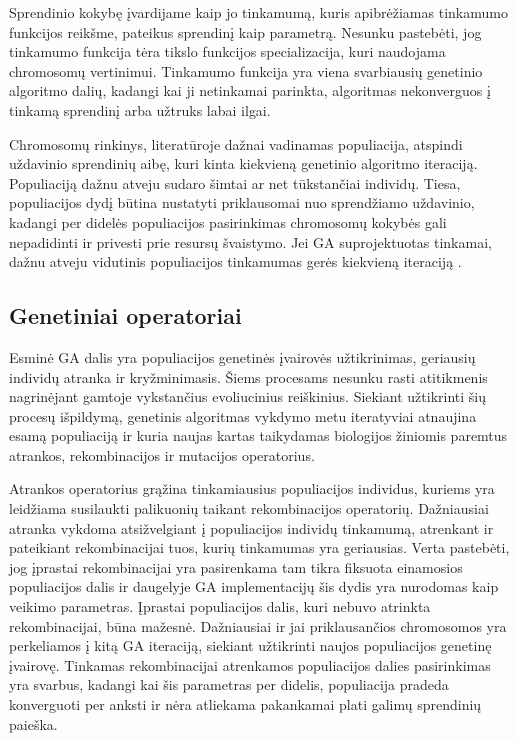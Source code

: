 \documentclass{VUMIFInfKursinis}
\begin{document}
Sprendinio kokybę įvardijame kaip jo tinkamumą, kuris apibrėžiamas tinkamumo funkcijos reikšme, pateikus sprendinį kaip parametrą.
Nesunku pastebėti, jog tinkamumo funkcija tėra tikslo funkcijos specializacija, kuri naudojama chromosomų vertinimui.
Tinkamumo funkcija yra viena svarbiausių genetinio algoritmo dalių,
kadangi kai ji netinkamai parinkta, algoritmas nekonverguos į tinkamą sprendinį arba užtruks labai ilgai.

Chromosomų rinkinys, literatūroje dažnai vadinamas populiacija, atspindi uždavinio sprendinių aibę, kuri kinta kiekvieną genetinio algoritmo iteraciją.
Populiaciją dažnu atveju sudaro šimtai ar net tūkstančiai individų.
Tiesa, populiacijos dydį būtina nustatyti priklausomai nuo sprendžiamo uždavinio, kadangi per didelės populiacijos pasirinkimas
chromosomų kokybės gali nepadidinti ir privesti prie resursų švaistymo.
Jei GA suprojektuotas tinkamai, dažnu atveju vidutinis populiacijos tinkamumas gerės kiekvieną iteraciją \cite{simpson1999faster}.

\subsection{Genetiniai operatoriai}

Esminė GA dalis yra populiacijos genetinės įvairovės užtikrinimas, geriausių individų atranka ir kryžminimasis.
Šiems procesams nesunku rasti atitikmenis nagrinėjant gamtoje vykstančius evoliucinius reiškinius.
Siekiant užtikrinti šių procesų išpildymą, genetinis algoritmas vykdymo metu
iteratyviai atnaujina esamą populiaciją ir kuria naujas kartas
taikydamas biologijos žiniomis paremtus atrankos, rekombinacijos ir mutacijos operatorius.

Atrankos operatorius grąžina tinkamiausius populiacijos individus, kuriems yra leidžiama susilaukti palikuonių taikant rekombinacijos operatorių.
Dažniausiai atranka vykdoma atsižvelgiant į populiacijos individų tinkamumą, atrenkant ir pateikiant rekombinacijai tuos, kurių tinkamumas yra geriausias.
Verta pastebėti, jog įprastai rekombinacijai yra pasirenkama tam tikra fiksuota einamosios populiacijos dalis
ir daugelyje GA implementacijų šis dydis yra nurodomas kaip veikimo parametras.
Įprastai populiacijos dalis, kuri nebuvo atrinkta rekombinacijai, būna mažesnė.
Dažniausiai ir jai priklausančios chromosomos yra perkeliamos į kitą GA iteraciją, siekiant užtikrinti naujos populiacijos genetinę įvairovę.
Tinkamas rekombinacijai atrenkamos populiacijos dalies pasirinkimas yra svarbus, kadangi
kai šis parametras per didelis, populiacija pradeda konverguoti per anksti ir nėra atliekama pakankamai plati galimų sprendinių paieška.
\end{document}

